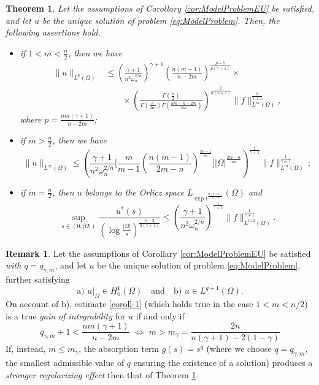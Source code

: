 \documentclass[11pt,a4paper]{amsart}
\theoremstyle{definition}
\newtheorem{remark}[definition]{Remark}
\theoremstyle{plain}
\newtheorem{theorem}[definition]{Theorem}
\numberwithin{equation}{section}
\begin{document}
\begin{theorem}\label{thm:MoreSummability}
	Let the assumptions of Corollary \ref{cor:ModelProblemEU} be satisfied, and let $u$ be the unique solution of problem \eqref{eq:ModelProblem}.
	Then, the following assertions hold.
	
	\begin{itemize}
		\item[(\emph{i})] if $1<m<\frac{n}{2}$, then we have
		\begin{equation}\label{coroll-1}
		\begin{split}
			\|u\|_{L^p(\Omega)} &\leq  \left(\frac{\gamma+1}{n^2 \omega_n^{2 / n}}\right)^{\gamma+1}\left(\frac{n(m-1)}{n-2 m}\right)^{\frac{p-1}{p(\gamma+1)}}\times \\
			&\qquad\times \left(\frac{\Gamma\left(\frac{n}{2}\right)}{\Gamma\left(\frac{n}{2 m}\right) \Gamma\left(\frac{n m-n+2 m}{2 m}\right)}\right)^{\frac{2}{n(\gamma+1)}}\|f\|_{L^m(\Omega)}^{\frac{1}{\gamma+1}},
			\end{split}
		\end{equation}
		where $p=\frac{n m(\gamma+1)}{n-2 m}$;
		\medskip
		
		\item[(\emph{ii})] if $m>\frac{n}{2}$, then we have
		\begin{equation}\label{coroll-2}
			\|u\|_{L^{\infty}(\Omega)} \leq\left(\frac{\gamma+1}{n^2 \omega_n^{2 / n}}\Big[\frac{m}{m-1}\left(\frac{n(m-1)}{2 m-n}\right)^{\frac{m-1}{m}}\Big]|\Omega|^{\frac{2 m-n}{n m}}\right)^{\frac{1}{\gamma+1}}\|f\|_{L^m(\Omega)}^{\frac{1}{\gamma+1}}\,;
		\end{equation}
		\item[(\emph{iii})] if $m=\frac{n}{2}$, then $u$ belongs to the Orlicz space $L_{\exp t^{\frac{n(\gamma+1)}{n-2}}}(\Omega)$ and
		\begin{equation}\label{coroll-3}
			\sup _{s \in(0,|\Omega|)} \frac{u^\ast(s)}{\left(\log \frac{|\Omega|}{s}\right)^{\frac{n-2}{n(\gamma+1)}}} \leq\left(\frac{\gamma+1}{n^2 \omega_n^{2 / n}}\right)^{\frac{1}{\gamma+1}}\|f\|_{L^{n / 2}(\Omega)}^{\frac{1}{\gamma+1}}.
		\end{equation}
	\end{itemize}
\end{theorem}
\begin{remark} \label{rem:StimaSignificativa}
Let the assumptions of Corollary \ref{cor:ModelProblemEU} be satisfied \emph{with $q = q_{\gamma,m}$},
and let $u$ be the unique solution of problem \eqref{eq:ModelProblem}, further satisfying $$\mathrm{a)}\,\,u|_\Omega\in H_0^1(\Omega)\quad\text{and}\quad 
\mathrm{b)}\,\,u\in L^{q+1}(\Omega).$$
On account of b), estimate \eqref{coroll-1} (which holds true in the case $1<m<n/2$) is a true
\emph{gain of integrability}	 for $u$ if and only if
$$q_{\gamma,m}+1< \frac{nm(\gamma+1)}{n-2m}\,\,\Longleftrightarrow\,\,
m >m_\gamma =\frac{2n}{n(\gamma+1)-2(1-\gamma)} $$
If, instead, $m\leq m_\gamma$, the absorption term $g(s) = s^q$ (where we choose $q = q_{\gamma,m}$, the smallest admissible value of $q$ ensuring the existence of a solution) produces a 
\emph{stronger regularizing effect} then that of Theorem \ref{thm:MoreSummability}.
\end{remark}
\end{document}
